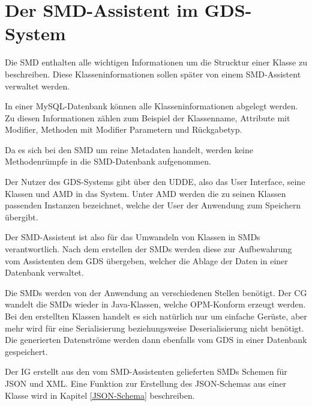 \section{Der SMD-Assistent im GDS-System}
Die \ac{SMD} enthalten alle wichtigen Informationen um die Strucktur einer Klasse zu beschreiben. Diese Klasseninformationen sollen sp\"ater von einem SMD-Assistent verwaltet werden.

In einer MySQL-Datenbank k\"onnen alle Klasseninformationen abgelegt werden. Zu diesen Informationen z\"ahlen zum Beispiel der Klassenname, Attribute mit Modifier, Methoden mit Modifier Parametern und R\"uckgabetyp. 

Da es sich bei den \ac{SMD} um reine Metadaten handelt, werden keine Methodenr\"umpfe in die \ac{SMD}-Datenbank aufgenommen.

Der Nutzer des \ac{GDS}-Systems gibt \"uber den \ac{UDDE}, also das User Interface, seine Klassen und \ac{AMD} in das System.
Unter \ac{AMD} werden die zu seinen Klassen passenden Instanzen bezeichnet, welche der User der Anwendung zum Speichern \"ubergibt.

Der SMD-Assistent ist also f\"ur das Umwandeln von Klassen in \ac{SMD}s verantwortlich. Nach dem erstellen der \ac{SMD}s werden diese zur Aufbewahrung vom Assistenten dem \ac{GDS} \"ubergeben, welcher die Ablage der Daten in einer Datenbank verwaltet.

Die \ac{SMD}s werden von der Anwendung an verschiedenen Stellen ben\"otigt. Der \ac{CG} wandelt die \ac{SMD}s wieder in Java-Klassen, welche OPM-Konform erzeugt werden. Bei den erstellten Klassen handelt es sich nat\"urlich nur um einfache Ger\"uste, aber mehr wird f\"ur eine Serialisierung beziehungsweise Deserialisierung nicht ben\"otigt.
Die generierten Datenstr\"ome werden dann ebenfalls vom \ac{GDS} in einer Datenbank gespeichert.

Der \ac{IG} erstellt aus den vom SMD-Assistenten gelieferten \ac{SMD}s Schemen f\"ur JSON und XML. Eine Funktion zur Erstellung des JSON-Schemas aus einer Klasse wird in Kapitel \ref{JSON-Schema} beschreiben.


